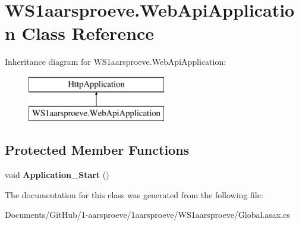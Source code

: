 \hypertarget{class_w_s1aarsproeve_1_1_web_api_application}{}\section{W\+S1aarsproeve.\+Web\+Api\+Application Class Reference}
\label{class_w_s1aarsproeve_1_1_web_api_application}
Inheritance diagram for W\+S1aarsproeve.\+Web\+Api\+Application\+:\begin{figure}[H]
\begin{center}
\leavevmode
\includegraphics[height=2.000000cm]{class_w_s1aarsproeve_1_1_web_api_application}
\end{center}
\end{figure}
\subsection*{Protected Member Functions}
\begin{DoxyCompactItemize}
\item 
\hypertarget{class_w_s1aarsproeve_1_1_web_api_application_ae4903302ddba7a9d08ad6369981f7b75}{}void {\bfseries Application\+\_\+\+Start} ()\label{class_w_s1aarsproeve_1_1_web_api_application_ae4903302ddba7a9d08ad6369981f7b75}

\end{DoxyCompactItemize}


The documentation for this class was generated from the following file\+:\begin{DoxyCompactItemize}
\item 
Documents/\+Git\+Hub/1-\/aarsproeve/1aarsproeve/\+W\+S1aarsproeve/Global.\+asax.\+cs\end{DoxyCompactItemize}
